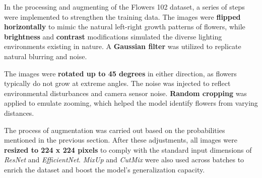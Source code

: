 In the processing and augmenting of the Flowers 102 dataset, a series of steps were implemented to strengthen the training data. The images were \textbf{flipped horizontally} to mimic the natural left-right growth patterns of flowers, while \textbf{brightness} and \textbf{contrast} modifications simulated the diverse lighting environments existing in nature. A \textbf{Gaussian filter} was utilized to replicate natural blurring and noise.

The images were \textbf{rotated up to 45 degrees} in either direction, as flowers typically do not grow at extreme angles. The noise was injected to reflect environmental disturbances and camera sensor noise. \textbf{Random cropping} was applied to emulate zooming, which helped the model identify flowers from varying distances.

The process of augmentation was carried out based on the probabilities mentioned in the previous section. After these adjustments, all images were \textbf{resized to 224 x 224 pixels} to comply with the standard input dimensions of \textit{ResNet} and \textit{EfficientNet}. \textit{MixUp} and \textit{CutMix} were also used across batches to enrich the dataset and boost the model's generalization capacity.

